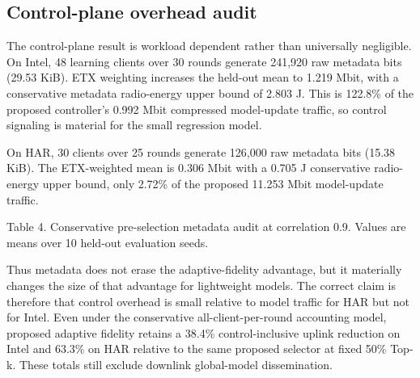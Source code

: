 \documentclass[11pt]{article}
\begin{document}
\subsection*{Control-plane overhead audit}
The control-plane result is workload dependent rather than universally negligible. On Intel, 48 learning clients over 30 rounds generate 241,920 raw metadata bits (29.53 KiB). ETX weighting increases the held-out mean to 1.219 Mbit, with a conservative metadata radio-energy upper bound of 2.803 J. This is 122.8\% of the proposed controller's 0.992 Mbit compressed model-update traffic, so control signaling is material for the small regression model.\par
On HAR, 30 clients over 25 rounds generate 126,000 raw metadata bits (15.38 KiB). The ETX-weighted mean is 0.306 Mbit with a 0.705 J conservative radio-energy upper bound, only 2.72\% of the proposed 11.253 Mbit model-update traffic.\par
Table 4. Conservative pre-selection metadata audit at correlation 0.9. Values are means over 10 held-out evaluation seeds.\par
\begin{table}[htbp]\centering\scriptsize
{}
\end{table}
Thus metadata does not erase the adaptive-fidelity advantage, but it materially changes the size of that advantage for lightweight models. The correct claim is therefore that control overhead is small relative to model traffic for HAR but not for Intel. Even under the conservative all-client-per-round accounting model, proposed adaptive fidelity retains a 38.4\% control-inclusive uplink reduction on Intel and 63.3\% on HAR relative to the same proposed selector at fixed 50\% Top-k. These totals still exclude downlink global-model dissemination.\par
\end{document}
